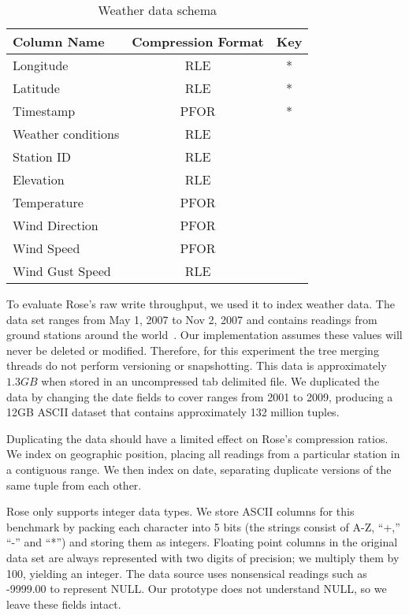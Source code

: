 \documentclass{vldb}
\newcommand{\rows}{Rose\xspace}
\newcommand{\rowss}{Rose's\xspace}
\begin{document}
\begin{table}
\caption{Weather data schema}
\centering
\label{tab:schema}
\begin{tabular}{|l|c|c|} \hline
Column Name     & Compression Format &  Key \\ \hline
Longitude       & RLE       & *       \\ \hline
Latitude        & RLE       & *       \\\hline
Timestamp       & PFOR       & *       \\\hline
Weather conditions& RLE       &        \\\hline
Station ID        & RLE       &        \\\hline
Elevation        & RLE       &        \\\hline
Temperature      & PFOR       &        \\\hline
Wind Direction        & PFOR       &        \\\hline
Wind Speed        & PFOR       &        \\\hline
Wind Gust Speed   & RLE       &        \\
\hline\end{tabular}
\end{table}

To evaluate \rowss raw write throughput, we used it to index
weather data.  The data set ranges from May 1,
2007 to Nov 2, 2007 and contains readings from ground stations around
the world~\cite{nssl}.  Our implementation assumes these values will never be deleted or modified.  Therefore, for this experiment the tree merging threads do not perform versioning or snapshotting.  This data is approximately $1.3GB$ when stored in an
uncompressed tab delimited file.  We duplicated the data by changing
the date fields to cover ranges from 2001 to 2009, producing a 12GB
ASCII dataset that contains approximately 132 million tuples.

Duplicating the data should have a limited effect on \rowss
compression ratios.  We index on geographic position, placing
all readings from a particular station in a contiguous range.  We then
index on date, separating duplicate versions of the same tuple
from each other.

\rows only supports integer data types.  We store ASCII columns for this benchmark by
packing each character into 5 bits (the strings consist of
A-Z, ``+,'' ``-'' and ``*'') and storing them as integers.  Floating point columns in
the original data set are always represented with two digits of precision;
we multiply them by 100, yielding an integer.  The data source uses
nonsensical readings such as -9999.00 to represent NULL.  Our
prototype does not understand NULL, so we leave these fields intact.
\end{document}
